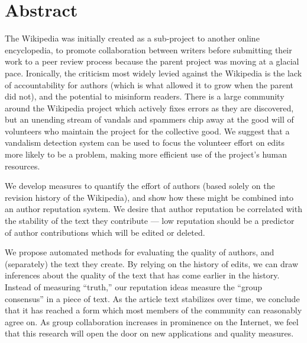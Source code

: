 \chapter{Abstract}
\begin{comment}
WikiTrust: From Quantity to Quality
by
B. Thomas Adler
\end{comment}

The Wikipedia was initially created as a sub-project to another
online encyclopedia, to promote collaboration between writers
before submitting their work to a peer review process because
the parent project was moving at a glacial pace.
Ironically, the criticism most widely levied against the Wikipedia
is the lack of accountability
for authors (which is what allowed it to grow when the parent did not),
and the potential to misinform readers.
There is a large community around the Wikipedia project which actively
fixes errors as they are discovered, but an unending
stream of vandals and spammers chip
away at the good will of volunteers who
maintain the project for the collective good.
We suggest that a vandalism detection system
can be used to focus
the volunteer effort on edits more likely to be a problem,
making more efficient use of the project's human resources.

We develop measures to quantify the effort of authors
(based solely on the revision history of the Wikipedia),
and show how these might be combined into an author
reputation system.
We desire that author reputation be correlated with the
stability of the text they contribute ---
low reputation should be a predictor of author
contributions which will be edited or deleted.

We propose automated methods for evaluating the quality of
authors, and (separately) the text they create.
By relying on the history of edits, we can draw inferences about
the quality of the text that has come earlier in the history.
Instead of measuring ``truth,'' our reputation ideas
measure the ``group consensus'' in a piece of text.
As the article text stabilizes over time, we conclude that
it has reached a form which most members of the community can
reasonably agree on.
As group collaboration increases in prominence on the Internet,
we feel that this research will open the door on new applications
and quality measures.

